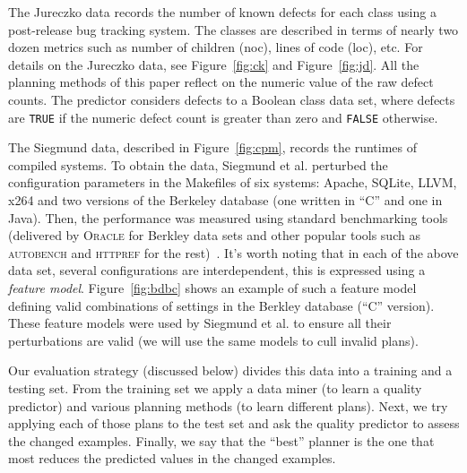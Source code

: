\documentclass{sig-alternate}
\newcommand{\fig}[1]{Figure~\ref{fig:#1}}
\begin{document}
  
  
   The Jureczko data records the number of known defects for each class using a post-release bug tracking system. The classes are described in terms of
  nearly two dozen metrics such as number of children (noc), lines of code (loc), etc. For details on the Jureczko data, see  \fig{ck} and \fig{jd}. 
 All the planning methods of this paper reflect on the numeric value of the raw defect counts. The predictor considers defects to a Boolean class data set, where defects are \texttt{TRUE} if the numeric defect count is greater than zero and \texttt{FALSE} otherwise.

  The Siegmund data, described in \fig{cpm},  records  the runtimes of compiled systems. To obtain the  data, Siegmund et al. perturbed
  the configuration parameters in the Makefiles of six systems: Apache, SQLite, LLVM, x264 and two versions of the
  Berkeley database (one written in ``C'' and one in Java). Then, the performance was measured using standard benchmarking tools (delivered by \textsc{Oracle} for Berkley data sets and other popular tools such as \textsc{autobench} and \textsc{httpref} for the rest)~\cite{sven12}. It's worth noting that in each of the above data set, several configurations are interdependent, this is expressed using a \textit{feature model}.
   \fig{bdbc} shows an example of such a feature model defining valid combinations of settings in the Berkley database (``C'' version). These feature models were used by Siegmund et al. to ensure all their perturbations are valid
   (we will use the same models to cull invalid plans).
  


  Our evaluation strategy (discussed below) divides this data into a training and a testing set.
  From the training set we apply a data miner (to learn a quality predictor) and
  various planning methods (to learn different plans). Next, we try applying
  each of those plans to the  test set and ask the quality predictor to assess the changed examples.
  Finally, we say that the  ``best'' planner is the one that most reduces the predicted values
  in the changed examples.
  
\end{document}

